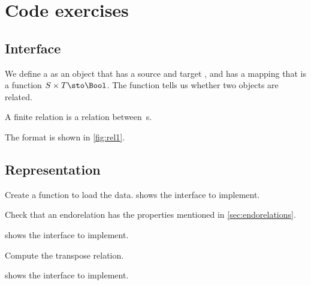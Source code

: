 \section{\usebox{\chaptergear}
Code exercises}

\subsection*{Interface}

We define a \Relation as an object that has a source and target \Setoid, and has a mapping that is a function $S \times T \sto \Bool$.
The function tells us whether two objects are related.


A finite relation  is a relation between \FiniteSet\,s.


The format is shown in \cref{fig:rel1}.


\subsection*{Representation}{}


\begin{marginfigure}
    \caption{}
    \label{fig:rel1}
\end{marginfigure}

\begin{codeexercise}
    Create a function to load the data.
     shows the interface to implement.

\end{codeexercise}




\begin{codeexercise}

    Check that an endorelation has the properties mentioned in \cref{sec:endorelations}.

     shows the interface to implement.
\end{codeexercise}


\begin{codeexercise}
    Compute the transpose relation.

     shows the interface to implement.
\end{codeexercise}

